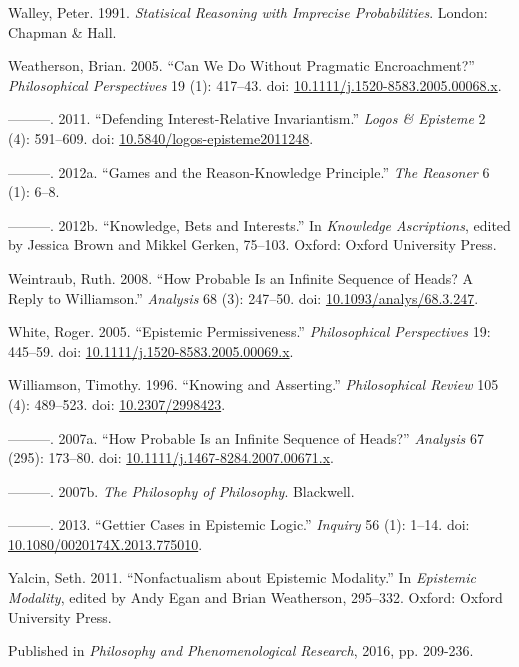 \documentclass[
  11pt,
  letterpaper,
  DIV=11,
  numbers=noendperiod,
  twoside]{scrartcl}
\newlength{\cslhangindent}
\newenvironment{CSLReferences}[2] %
 {\begin{list}{}{%
  \setlength{\itemindent}{0pt}
  \setlength{\leftmargin}{0pt}
  \setlength{\parsep}{0pt}
  \ifodd #1
   \setlength{\leftmargin}{\cslhangindent}
   \setlength{\itemindent}{-1\cslhangindent}
  \fi
  \setlength{\itemsep}{#2\baselineskip}}}
 {\end{list}}
\begin{document}
\begin{CSLReferences}{1}{0}
Walley, Peter. 1991. \emph{Statisical Reasoning with Imprecise
Probabilities}. London: Chapman \& Hall.

Weatherson, Brian. 2005. {``{Can We Do Without Pragmatic
Encroachment?}''} \emph{Philosophical Perspectives} 19 (1): 417--43.
doi:
\href{https://doi.org/10.1111/j.1520-8583.2005.00068.x}{10.1111/j.1520-8583.2005.00068.x}.

---------. 2011. {``Defending Interest-Relative Invariantism.''}
\emph{Logos \& Episteme} 2 (4): 591--609. doi:
\href{https://doi.org/10.5840/logos-episteme2011248}{10.5840/logos-episteme2011248}.

---------. 2012a. {``Games and the Reason-Knowledge Principle.''}
\emph{The Reasoner} 6 (1): 6--8.

---------. 2012b. {``Knowledge, Bets and Interests.''} In
\emph{Knowledge Ascriptions}, edited by Jessica Brown and Mikkel Gerken,
75--103. Oxford: Oxford University Press.

Weintraub, Ruth. 2008. {``How Probable Is an Infinite Sequence of Heads?
A Reply to Williamson.''} \emph{Analysis} 68 (3): 247--50. doi:
\href{https://doi.org/10.1093/analys/68.3.247}{10.1093/analys/68.3.247}.

White, Roger. 2005. {``Epistemic Permissiveness.''} \emph{Philosophical
Perspectives} 19: 445--59. doi:
\href{https://doi.org/10.1111/j.1520-8583.2005.00069.x}{10.1111/j.1520-8583.2005.00069.x}.

Williamson, Timothy. 1996. {``{Knowing and Asserting}.''}
\emph{Philosophical Review} 105 (4): 489--523. doi:
\href{https://doi.org/10.2307/2998423}{10.2307/2998423}.

---------. 2007a. {``How Probable Is an Infinite Sequence of Heads?''}
\emph{Analysis} 67 (295): 173--80. doi:
\href{https://doi.org/10.1111/j.1467-8284.2007.00671.x}{10.1111/j.1467-8284.2007.00671.x}.

---------. 2007b. \emph{{The Philosophy of Philosophy}}. Blackwell.

---------. 2013. {``Gettier Cases in Epistemic Logic.''} \emph{Inquiry}
56 (1): 1--14. doi:
\href{https://doi.org/10.1080/0020174X.2013.775010}{10.1080/0020174X.2013.775010}.

Yalcin, Seth. 2011. {``Nonfactualism about Epistemic Modality.''} In
\emph{Epistemic Modality}, edited by Andy Egan and Brian Weatherson,
295--332. Oxford: Oxford University Press.

\end{CSLReferences}



\noindent Published in\emph{
Philosophy and Phenomenological Research}, 2016, pp. 209-236.
\end{document}
